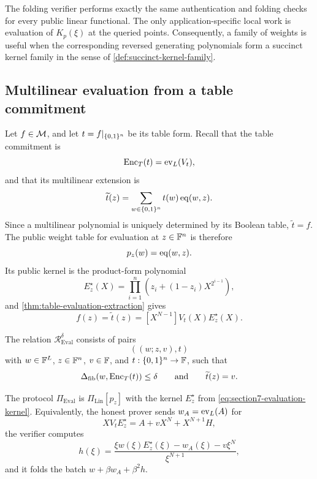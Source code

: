 \begin{remark}
\label{rem:linear-functional-verifier-cost}
The folding verifier performs exactly the same authentication and folding checks for every public linear functional.  The only application-specific local work is evaluation of \(K_p(\xi)\) at the queried points.  Consequently, a family of weights is useful when the corresponding reversed generating polynomials form a succinct kernel family in the sense of \cref{def:succinct-kernel-family}.
\end{remark}

\subsection{Multilinear evaluation from a table commitment}
\label{sec:table-mle-opening}

Let \(f\in\mathcal{M}\), and let \(t=f|_{\{0,1\}^n}\) be its table form.  Recall that the table commitment is
\[
  \operatorname{Enc}_T(t)=\operatorname{ev}_L(V_t),
\]
and that its multilinear extension is
\[
  \widetilde t(z)
  =\sum_{w\in\{0,1\}^n}t(w)\operatorname{eq}(w,z).
\]
Since a multilinear polynomial is uniquely determined by its Boolean table, \(\widetilde t=f\).  The public weight table for evaluation at \(z\in\mathbb{F}^n\) is therefore
\[
  p_z(w)=\operatorname{eq}(w,z).
\]
Its public kernel is the product-form polynomial
\begin{equation}
  E_z^{\star}(X)
  =\prod_{i=1}^{n}
      \left(z_i+(1-z_i)X^{2^{i-1}}\right),
  \label{eq:section7-evaluation-kernel}
\end{equation}
and \cref{thm:table-evaluation-extraction} gives
\begin{equation}
  f(z)=\widetilde t(z)
  =[X^{N-1}]V_t(X)E_z^{\star}(X).
  \label{eq:section7-mle-coefficient}
\end{equation}

\begin{definition}
\label{def:table-evaluation-relation}
The relation \(\mathcal R^{\delta}_{\mathrm{Eval}}\) consists of pairs
\[
  ((w;z,v),t)
\]
with \(w\in\mathbb{F}^L\), \(z\in\mathbb{F}^n\), \(v\in\mathbb{F}\), and \(t:\{0,1\}^n\to\mathbb{F}\), such that
\[
  \Delta_{\mathrm{fib}}(w,\operatorname{Enc}_T(t))\le\delta
  \qquad\text{and}\qquad
  \widetilde t(z)=v.
\]
\end{definition}

\begin{definition}
\label{def:table-evaluation-protocol}
The protocol \(\Pi_{\mathrm{Eval}}\) is \(\Pi_{\mathrm{Lin}}[p_z]\) with the kernel \(E_z^{\star}\) from \eqref{eq:section7-evaluation-kernel}.  Equivalently, the honest prover sends \(w_A=\operatorname{ev}_L(A)\) for
\begin{equation}
  XV_tE_z^{\star}=A+vX^N+X^{N+1}H,
  \label{eq:section7-evaluation-opening-identity}
\end{equation}
the verifier computes
\begin{equation}
  h(\xi)
  =\frac{\xi w(\xi)E_z^{\star}(\xi)-w_A(\xi)-v\xi^N}{\xi^{N+1}},
  \label{eq:section7-evaluation-virtual}
\end{equation}
and it folds the batch \(w+\beta w_A+\beta^2h\).
\end{definition}

